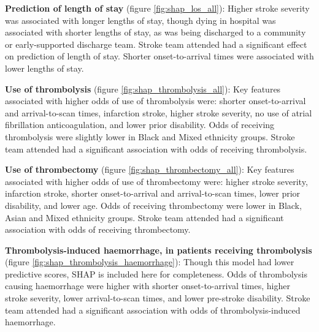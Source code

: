 \textbf{Prediction of length of stay} (figure \ref{fig:shap_los_all}): Higher stroke severity was associated with longer lengths of stay, though dying in hospital was associated with shorter lengths of stay, as was being discharged to a community or early-supported discharge team. Stroke team attended had a significant effect on prediction of length of stay. Shorter onset-to-arrival times were associated with lower lengths of stay.

\textbf{Use of thrombolysis} (figure \ref{fig:shap_thrombolysis_all}): Key features associated with higher odds of use of thrombolysis were: shorter onset-to-arrival and arrival-to-scan times, infarction stroke, higher stroke severity, no use of atrial fibrillation anticoagulation, and lower prior disability. Odds of receiving thrombolysis were slightly lower in Black and Mixed ethnicity groups. Stroke team attended had a significant association with odds of receiving thrombolysis.

\textbf{Use of thrombectomy} (figure \ref{fig:shap_thrombectomy_all}): Key features associated with higher odds of use of thrombectomy were: higher stroke severity, infarction stroke, shorter onset-to-arrival and arrival-to-scan times, lower prior disability, and lower age. Odds of receiving thrombectomy were  lower in Black, Asian and Mixed ethnicity groups. Stroke team attended had a significant association with odds of receiving thrombectomy.

\textbf{Thrombolysis-induced haemorrhage, in patients receiving thrombolysis} (figure \ref{fig:shap_thrombolysis_haemorrhage}): Though this model had lower predictive scores, SHAP is included here for completeness. Odds of thrombolysis causing haemorrhage were higher with shorter onset-to-arrival times, higher stroke severity, lower arrival-to-scan times, and lower pre-stroke disability. Stroke team attended had a significant association with odds of thrombolysis-induced haemorrhage.



